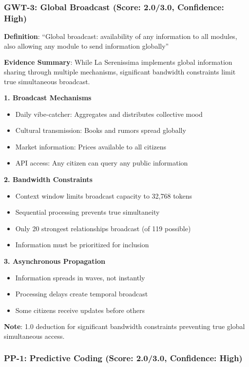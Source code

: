 \documentclass[12pt,a4paper]{article}
\begin{document}
\subsubsection{GWT-3: Global Broadcast (Score: 2.0/3.0, Confidence: High)}

\textbf{Definition}: ``Global broadcast: availability of any information to all modules, also allowing any module to send information globally''

\textbf{Evidence Summary}: While La Serenissima implements global information sharing through multiple mechanisms, significant bandwidth constraints limit true simultaneous broadcast.

\textbf{1. Broadcast Mechanisms}
\begin{itemize}
    \item Daily vibe-catcher: Aggregates and distributes collective mood
    \item Cultural transmission: Books and rumors spread globally
    \item Market information: Prices available to all citizens
    \item API access: Any citizen can query any public information
\end{itemize}

\textbf{2. Bandwidth Constraints}
\begin{itemize}
    \item Context window limits broadcast capacity to 32,768 tokens
    \item Sequential processing prevents true simultaneity
    \item Only 20 strongest relationships broadcast (of 119 possible)
    \item Information must be prioritized for inclusion
\end{itemize}

\textbf{3. Asynchronous Propagation}
\begin{itemize}
    \item Information spreads in waves, not instantly
    \item Processing delays create temporal broadcast
    \item Some citizens receive updates before others
\end{itemize}

\textbf{Note}: 1.0 deduction for significant bandwidth constraints preventing true global simultaneous access.

\subsubsection{PP-1: Predictive Coding (Score: 2.0/3.0, Confidence: High)}
\end{document}
